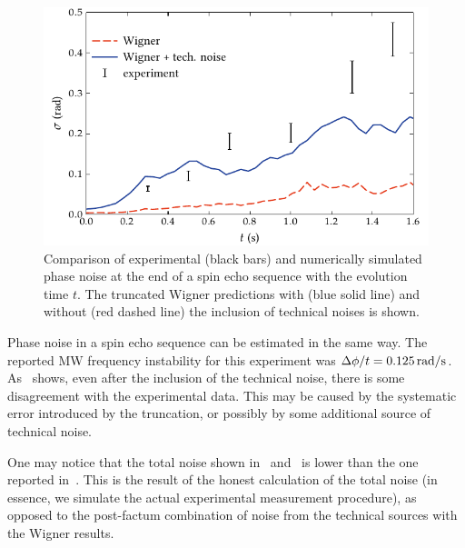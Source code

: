 \begin{figure}
    \centerline{\includegraphics{figures_generated/bec_noise/echo_noise.pdf}}

    \caption{Comparison of experimental (black bars) and numerically simulated phase noise at the end of a spin echo sequence with the evolution time $t$.
    The truncated Wigner predictions with (blue solid line) and without (red dashed line) the inclusion of technical noises is shown.}%

    \label{fig:bec-noise:phase-noise:echo-phnoise}
\end{figure}

Phase noise in a spin echo sequence can be estimated in the same way.
The reported MW frequency instability for this experiment was $\Delta \phi / t = 0.125\mbox{\ensuremath{\,\mathrm{rad/s}}}$.
As~ shows, even after the inclusion of the technical noise, there is some disagreement with the experimental data.
This may be caused by the systematic error introduced by the truncation, or possibly by some additional source of technical noise.

One may notice that the total noise shown in~ and~ is lower than the one reported in~\cite{Egorov2011,Egorov2012}.
This is the result of the honest calculation of the total noise (in essence, we simulate the actual experimental measurement procedure), as opposed to the post-factum combination of noise from the technical sources with the Wigner results.
